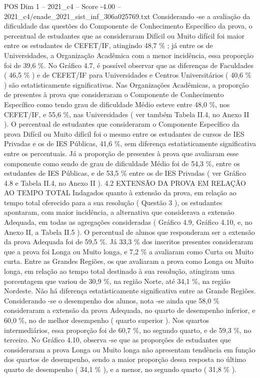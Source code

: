 \begin{textsample}{POS Dim 1 – 2021\_c4 – Score -4.00 – 2021\_c4/enade\_2021\_sist\_inf\_306a025769.txt}
Considerando -se a avaliação da dificuldade das questões do Componente de Conhecimento Específico da prova, o percentual de estudantes que as consideraram Difícil ou Muito difícil foi maior entre os estudantes de CEFET/IF, atingindo 48,7 \% ; já entre os de Universidades, a Organização Acadêmica com a menor incidência, essa proporção foi de 39,6 \%.
No Gráfico 4.7, é possível observar que as diferenças de Faculdades ( 46,5 \% ) e de CEFET/IF para Universidades e Centros Universitários ( 40,6 \% ) são estatisticamente significativas.
Nas Organizações Acadêmicas, a proporção de presentes à prova que consideraram o Componente de Conhecimento Específico como tendo grau de dificuldade Médio esteve entre 48,0 \%, nos CEFET/IF, e 55,6 \%, nas Universidades ( ver também Tabela II.4, no Anexo II ).
O percentual de estudantes que consideraram o Componente Específico da prova Difícil ou Muito difícil foi o mesmo entre os estudantes de cursos de IES Privadas e os de IES Públicas, 41,6 \%, sem diferença estatisticamente significativa entre os percentuais.
Já a proporção de presentes à prova que avaliaram esse componente como sendo de grau de dificuldade Médio foi de 54,3 \%, entre os estudantes de IES Públicas, e de 53,5 \% entre os de IES Privadas ( ver Gráfico 4.8 e Tabela II.4, no Anexo II ). 4.2 EXTENSÃO DA PROVA EM RELAÇÃO AO TEMPO TOTAL Indagados quanto à extensão da prova, em relação ao tempo total oferecido para a sua resolução ( Questão 3 ), os estudantes apontaram, com maior incidência, a alternativa que considerava a extensão Adequada, em todas as agregações consideradas ( Gráfico 4.9, Gráfico 4.10, e, no Anexo II, a Tabela II.5 ).
O percentual de alunos que responderam ser a extensão da prova Adequada foi de 59,5 \%.
Já 33,3 \% dos inscritos presentes consideraram que a prova foi Longa ou Muito longa, e 7,2 \% a avaliaram como Curta ou Muito curta.
Entre as Grandes Regiões, os que avaliaram a prova como Longa ou Muito longa, em relação ao tempo total destinado à sua resolução, atingiram uma porcentagem que variou de 30,9 \%, na região Norte, até 34,1 \%, na região Nordeste.
Não há diferença estatisticamente significativa entre as Grande Regiões.
Considerando -se o desempenho dos alunos, nota -se ainda que 58,0 \% consideraram a extensão da prova Adequada, no quarto de desempenho inferior, e 60,0 \%, no de melhor desempenho ( quarto superior ).
Nos quartos intermediários, essa proporção foi de 60,7 \%, no segundo quarto, e de 59,3 \%, no terceiro.
No Gráfico 4.10, observa -se que as proporções de estudantes que consideraram a prova Longa ou Muito longa não apresentam tendência em função dos quartos de desempenho, sendo a maior proporção dessa resposta no último quarto de desempenho ( 34,1 \% ), e a menor, no segundo quarto ( 31,8 \% ).

\end{textsample}
